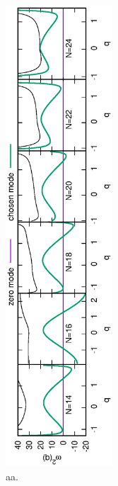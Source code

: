 \documentclass[%
superscriptaddress,
showpacs,
nofootinbib,
amsmath,amssymb,
aps,
prc,
twocolumn,
floatfix ]%
{revtex4-1}
\begin{document}
\begin{figure}[t]
 \begin{center}
  \includegraphics[width=40mm,angle=-90]{omega_sq.eps}
 \end{center}
 \captionsetup{labelformat=empty,labelsep=none}
	\caption{aa.
}
 \label{fig:N8Pad}
\end{figure}
\end{document}
